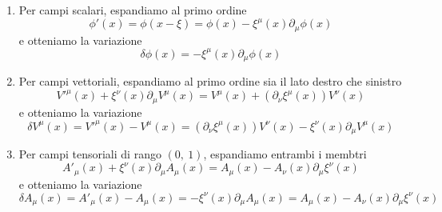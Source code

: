 \begin{enumerate}
    \item Per campi scalari, espandiamo al primo ordine
\begin{equation}
    \phi'(x) = \phi(x - \xi) = \phi(x) - \xi^\mu(x) \partial_\mu \phi(x)
\end{equation}  
    e otteniamo la variazione
\begin{equation}\label{variazionescalare}
    \delta \phi(x) = - \xi^\mu(x) \partial_\mu \phi(x)
\end{equation} 
    \item Per campi vettoriali, espandiamo al primo ordine sia il lato destro che sinistro
\begin{equation}
    V'^\mu(x) + \xi^\nu(x) \partial_\mu V^\mu (x) = V^\mu(x) + (\partial_\nu \xi^\mu(x)) V^\nu(x)
\end{equation}
    e otteniamo la variazione
\begin{equation}\label{variazionevett}
    \delta V^\mu(x) = V'^\mu(x) - V^\mu(x) = (\partial_\nu \xi^\mu(x)) V^\nu(x) - \xi^\nu (x)\partial_\mu V^\mu(x)
\end{equation}
    \item Per campi tensoriali di rango $(0,~1)$, espandiamo entrambi i membtri 
\begin{equation}
    A'_\mu(x) + \xi^\nu(x) \partial_\mu A_\mu (x) = A_\mu(x) - A_\nu(x) \partial_\mu \xi^\nu(x)
\end{equation}
    e otteniamo la variazione
\begin{equation}\label{variazione10}
    \delta A_\mu(x) = A'_\mu(x) - A_\mu(x) = - \xi^\nu(x) \partial_\mu A_\mu (x) = A_\mu(x) - A_\nu(x) \partial_\mu \xi^\nu(x)
\end{equation}
\end{enumerate}

